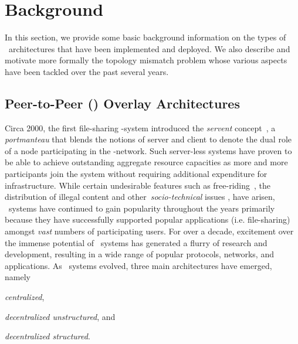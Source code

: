 \section{Background}
\label{section:background}

In this section, we provide some basic background information on the types of
\p\ architectures that have been implemented and deployed. We also
describe and motivate more formally the topology mismatch problem 
whose various aspects have been tackled over the past several years.

\subsection{Peer-to-Peer (\p) Overlay Architectures}
Circa 2000, the first file-sharing \p-system introduced the \emph{servent}
concept~\cite{gnutella}, a \emph{portmanteau} that blends the notions of server
and client to denote the dual role of a node participating in the \p-network. 
Such server-less systems have proven to be able to achieve outstanding
aggregate resource capacities as more and more participants join the system
without requiring additional expenditure for infrastructure. 
While certain undesirable features such as 
free-riding~\cite{saroiu_measurefileshare_2002,adar_gnutellafreeriders_2000,hughes_gnutellafreeride_2005},
the distribution of illegal content and other~\emph{socio-technical}
issues \cite{hughes_socp2p_2008}, have arisen, \p\ systems have
continued to gain popularity throughout the years primarily 
because they have successfully supported popular applications 
(i.e. file-sharing) amongst \emph{vast} numbers of participating users.
For over a decade, excitement over the immense potential of \p\ systems has
generated a flurry of research and development, resulting in a wide range of
popular protocols, networks, and applications. As \p\ systems evolved, three
main architectures have emerged, namely
\begin{inparaenum}
  \item \emph{centralized},
  \item \emph{decentralized unstructured}, and
  \item \emph{decentralized structured}.
\end{inparaenum}

